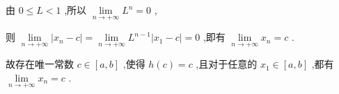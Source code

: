 \documentclass[10pt]{article}
\begin{document}
由 \(0 \leq  L < 1\) ,所以 \(\mathop{\lim }\limits_{{n \rightarrow   + \infty }}{L}^{n} = 0\) ,

则 \(\mathop{\lim }\limits_{{n \rightarrow   + \infty }}\left| {{x}_{n} - c}\right|  = \mathop{\lim }\limits_{{n \rightarrow   + \infty }}{L}^{n - 1}\left| {{x}_{1} - c}\right|  = 0\) ,即有 \(\mathop{\lim }\limits_{{n \rightarrow   + \infty }}{x}_{n} = c\) .

故存在唯一常数 \(c \in  \left\lbrack  {a,b}\right\rbrack\) ,使得 \(h\left( c\right)  = c\) ,且对于任意的 \({x}_{1} \in  \left\lbrack  {a,b}\right\rbrack\) ,都有 \(\mathop{\lim }\limits_{{n \rightarrow   + \infty }}{x}_{n} = c\) .
\end{document}
